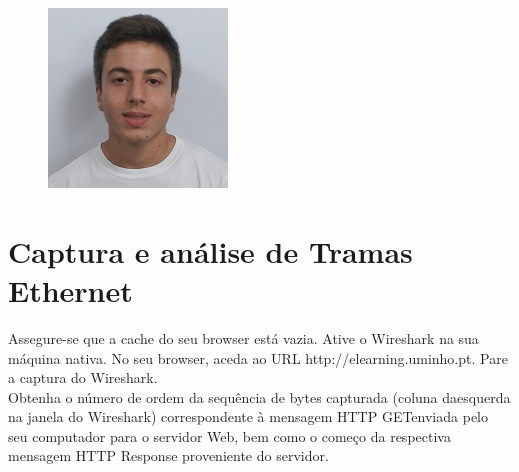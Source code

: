 \documentclass[11pt]{article}
\begin{document}
\begin{titlepage}
\begin{center}
\begin{figure}[hbt!]
            \centering
            \captionsetup{A89585}
        \endminipage\hfill
            \includegraphics[width=\linewidth]{images/capa/80.jpeg}
            \centering
            \captionsetup{A89597}
        \endminipage
        \end{figure}
    \end{center}
\end{titlepage}

\tableofcontents
\thispagestyle{empty}
\cleardoublepage

\setcounter{page}{1}


\section{Captura e análise de Tramas Ethernet}

Assegure-se que a cache do seu browser está vazia. Ative o Wireshark na sua máquina nativa. No seu browser, aceda ao URL http://elearning.uminho.pt. Pare a captura do Wireshark.\\

Obtenha o número de ordem da sequência de bytes capturada (coluna daesquerda na janela do Wireshark) correspondente à mensagem HTTP GETenviada pelo seu computador para o servidor Web, bem como o começo da respectiva mensagem HTTP Response proveniente do servidor.\\ 
\end{document}
